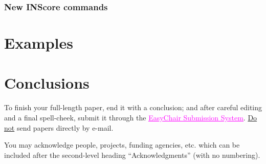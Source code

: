 \documentclass{article}
\newenvironment{INScode}		{\vspace{-2mm}\small\verbatim}{\endverbatim\vspace{-2mm}}
\begin{document}
\subsubsection{New INScore commands}

\section{Examples}

\section{Conclusions}
To finish your full-length paper, end it with a conclusion;
and after careful editing and a final spell-cheek,
submit it through the \href{https://easychair.org/conferences/?conf=tenor2016}{\textcolor {magenta} {\underline {EasyChair Submission System}}}. 
\underline{Do not} send papers directly by e-mail.
%
\begin{acknowledgments}
You may acknowledge people, projects, 
funding agencies, etc. 
which can be included after the second-level heading
``Acknowledgments'' (with no numbering).
\end{acknowledgments} 



%               
%      
\end{document}
